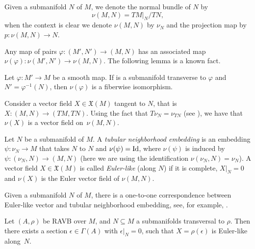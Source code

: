 Given a submanifold $N$ of $M$, we denote the normal bundle of $N$ by
\[\nu(M,N)=TM|_{N}/TN,
\]
 when the context is clear we denote $\nu(M,N)$ by $\nu_N$ and the projection map by $p\colon \nu(M,N)\to N$.

Any map of pairs $\varphi\colon (M',N')\to (M,N)$ has an associated map $\nu(\varphi)\colon \nu(M',N')\to \nu(M,N).$
The following lemma is a known fact.
\begin{Lemma}\label{fiberwise_isom}
Let $\varphi\colon M'\to M$ be a smooth map. If  is a submanifold transverse to $\varphi$ and $N'=\varphi^{-1}(N)$, then $\nu(\varphi)$ is a fiberwise isomorphism.
\end{Lemma}
Consider a vector field $X\in \mathfrak{X}(M)$ tangent to $N$, that is $X\colon (M,N)\to (TM,TN)$. Using the fact that $T\nu_N=\nu_{TN}$ (see \cite[Appendix A]{bursztyn2019splitting}), we have that $\nu(X)$ is a vector field on~$\nu(M,N)$.
\begin{Definition}\label{defTN-EL}
Let $N$ be a submanifold of $M$. A {\em tubular neighborhood embedding} is an embedding
$\psi\colon \nu_N\to M$ that takes $N$ to $N$ and $\nu(\psi)={\rm Id}$, where $\nu(\psi)$ is induced by $\psi\colon (\nu_N,N)\to (M,N)$ (here we are using the identification $\nu(\nu_N,N)=\nu_N$).
A vector field $X\in\mathfrak{X}(M)$ is called {\em Euler-like} (along $N$) if it is complete, $X|_{N}=0$ and $\nu(X)$ is the Euler vector field of $\nu(M,N)$.
\end{Definition}
Given a submanifold $N$ of $M$, there is a one-to-one correspondence between Euler-like vector and tubular neighborhood embedding, see, for example, \cite{bursztyn2019splitting}.
\begin{Lemma}\label{existence_esp_section}
Let $(A, \rho)$ be RAVB over $M$, and $N\subseteq M$ a submanifolds transversal to $\rho$.
Then there exists a section $\epsilon\in \Gamma(A)$ with $\epsilon|_N = 0$, such that $X = \rho(\epsilon)$ is Euler-like along~$N$.
\end{Lemma}

